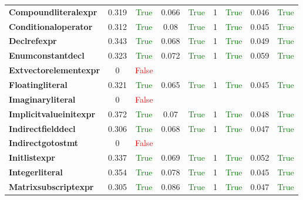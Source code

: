 \documentclass{article}
\begin{document}
\begin{xltabular}{\textwidth}{lcccccccc}
\textbf{{\fontsize{10}{12}\selectfont Compoundliteralexpr}}& 0.319&\textcolor{green}{True}& 0.066&\textcolor{green}{True}& 1&\textcolor{green}{True}& 0.046&\textcolor{green}{True} \\[0.5ex]
\textbf{{\fontsize{10}{12}\selectfont Conditionaloperator}}& 0.312&\textcolor{green}{True}& 0.08&\textcolor{green}{True}& 1&\textcolor{green}{True}& 0.045&\textcolor{green}{True} \\[0.5ex]
\textbf{{\fontsize{10}{12}\selectfont Declrefexpr}}& 0.343&\textcolor{green}{True}& 0.068&\textcolor{green}{True}& 1&\textcolor{green}{True}& 0.049&\textcolor{green}{True} \\[0.5ex]
\textbf{{\fontsize{10}{12}\selectfont Enumconstantdecl}}& 0.323&\textcolor{green}{True}& 0.072&\textcolor{green}{True}& 1&\textcolor{green}{True}& 0.059&\textcolor{green}{True} \\[0.5ex]
\textbf{{\fontsize{10}{12}\selectfont Extvectorelementexpr}}& 0&\textcolor{red}{False} \\[0.5ex]
\textbf{{\fontsize{10}{12}\selectfont Floatingliteral}}& 0.321&\textcolor{green}{True}& 0.065&\textcolor{green}{True}& 1&\textcolor{green}{True}& 0.045&\textcolor{green}{True} \\[0.5ex]
\textbf{{\fontsize{10}{12}\selectfont Imaginaryliteral}}& 0&\textcolor{red}{False} \\[0.5ex]
\textbf{{\fontsize{10}{12}\selectfont Implicitvalueinitexpr}}& 0.372&\textcolor{green}{True}& 0.07&\textcolor{green}{True}& 1&\textcolor{green}{True}& 0.048&\textcolor{green}{True} \\[0.5ex]
\textbf{{\fontsize{10}{12}\selectfont Indirectfielddecl}}& 0.306&\textcolor{green}{True}& 0.068&\textcolor{green}{True}& 1&\textcolor{green}{True}& 0.047&\textcolor{green}{True} \\[0.5ex]
\textbf{{\fontsize{10}{12}\selectfont Indirectgotostmt}}& 0&\textcolor{red}{False} \\[0.5ex]
\textbf{{\fontsize{10}{12}\selectfont Initlistexpr}}& 0.337&\textcolor{green}{True}& 0.069&\textcolor{green}{True}& 1&\textcolor{green}{True}& 0.052&\textcolor{green}{True} \\[0.5ex]
\textbf{{\fontsize{10}{12}\selectfont Integerliteral}}& 0.354&\textcolor{green}{True}& 0.078&\textcolor{green}{True}& 1&\textcolor{green}{True}& 0.045&\textcolor{green}{True} \\[0.5ex]
\textbf{{\fontsize{10}{12}\selectfont Matrixsubscriptexpr}}& 0.305&\textcolor{green}{True}& 0.086&\textcolor{green}{True}& 1&\textcolor{green}{True}& 0.047&\textcolor{green}{True} \\[0.5ex]

\end{xltabular}
\end{document}

